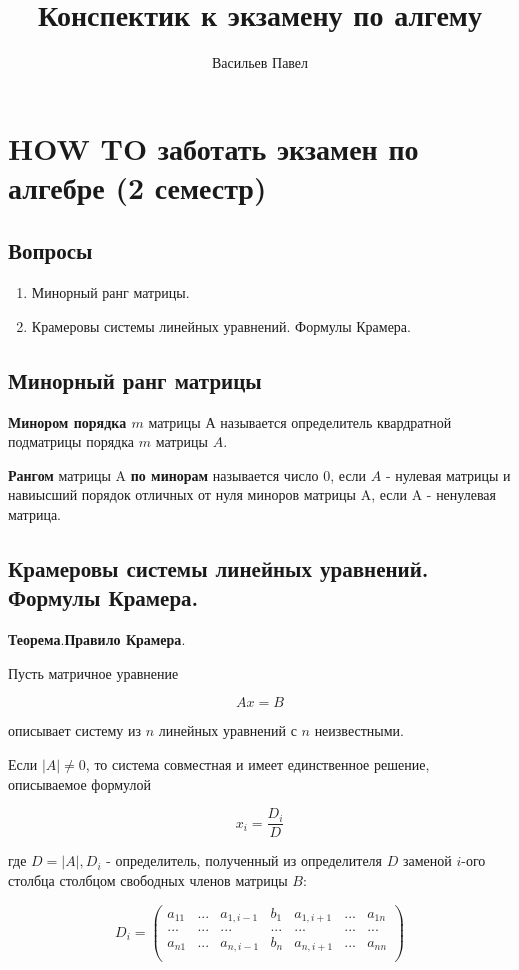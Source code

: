 \documentclass[a4paper]{article}
\title{Конспектик к экзамену по алгему}
\author{Васильев Павел}
\begin{document}
\section*{HOW TO заботать экзамен по алгебре (2 семестр)}

\subsection*{Вопросы}

\begin{enumerate}
\item Минорный ранг матрицы.
\item Крамеровы системы линейных уравнений. Формулы Крамера.
\end{enumerate}


\subsection*{Минорный ранг матрицы}

\textbf{Минором порядка $m$} матрицы А называется определитель квардратной подматрицы порядка $m$ матрицы $A$.

\textbf{Рангом} матрицы A \textbf{по минорам} называется число 0, если $A$ - нулевая матрицы и навиысший порядок отличных от нуля миноров матрицы A, если 
A - ненулевая матрица.

\subsection*{Крамеровы системы линейных уравнений. Формулы Крамера.}

\begin{htheorem}\textbf{Теорема}.\textbf{Правило Крамера}.

Пусть матричное уравнение 

\[ Ax = B \]

описывает систему из $n$ линейных уравнений с $n$ неизвестными.

Если $|A| \neq 0$, то система совместная и имеет единственное решение, описываемое формулой 

\[ x_i = \frac{D_i}{D} \]

где $D = |A|, D_i$ - определитель, полученный из определителя $D$ заменой $i$-ого столбца столбцом свободных членов матрицы $B$:

\[
D_i = \begin{pmatrix}
a_{11} & ... & a_{1, i-1} & b_1 & a_{1, i+1} & ... & a_{1n} \\
... & ... & ... & ... & ... & ... & ... \\
a_{n1} & ... & a_{n, i-1} & b_n & a_{n, i+1} & ... & a_{nn} \\
\end{pmatrix}
\]
\end{htheorem}
\end{document}
